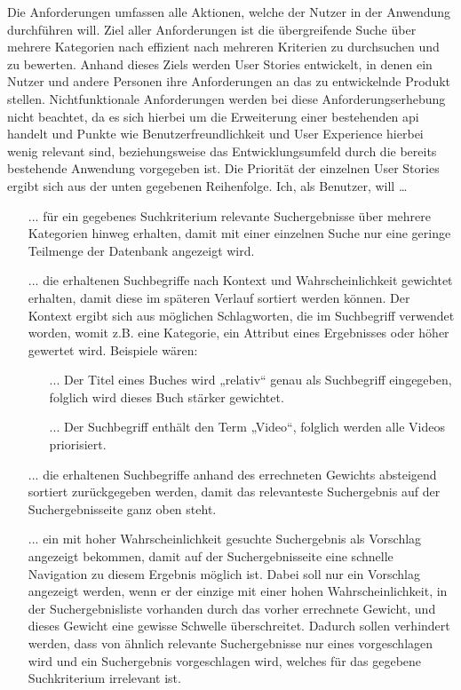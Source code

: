 Die Anforderungen umfassen alle Aktionen, welche der Nutzer in der Anwendung durchführen will. Ziel aller Anforderungen ist die übergreifende Suche über mehrere Kategorien nach effizient nach mehreren Kriterien zu durchsuchen und zu bewerten. Anhand dieses Ziels werden User Stories entwickelt, in denen ein Nutzer und andere Personen ihre Anforderungen an das zu entwickelnde Produkt stellen.
Nichtfunktionale Anforderungen werden bei diese Anforderungserhebung nicht beachtet, da es sich hierbei um die Erweiterung einer bestehenden \gls{api} handelt und Punkte wie Benutzerfreundlichkeit und User Experience hierbei wenig relevant sind, beziehungsweise das Entwicklungsumfeld durch die bereits bestehende Anwendung vorgegeben ist.
Die Priorität der einzelnen User Stories ergibt sich aus der unten gegebenen Reihenfolge.
Ich, als Benutzer, will …
\begin{itemize}
  \item[...] für ein gegebenes Suchkriterium relevante Suchergebnisse über mehrere Kategorien hinweg erhalten, damit mit einer einzelnen Suche nur eine geringe Teilmenge der Datenbank angezeigt wird.
  \item[...] die erhaltenen Suchbegriffe nach Kontext und Wahrscheinlichkeit gewichtet erhalten, damit diese im späteren Verlauf sortiert werden können. Der Kontext ergibt sich aus möglichen Schlagworten, die im Suchbegriff verwendet worden, womit z.B. eine Kategorie, ein Attribut eines Ergebnisses oder höher gewertet wird. Beispiele wären:
    \begin{itemize}
      \item[...] Der Titel eines Buches wird „relativ“ genau als Suchbegriff eingegeben, folglich wird dieses Buch stärker gewichtet.
      \item[...] Der Suchbegriff enthält den Term „Video“, folglich werden alle Videos priorisiert.
    \end{itemize}
  \item[...] die erhaltenen Suchbegriffe anhand des errechneten Gewichts absteigend sortiert zurückgegeben werden, damit das relevanteste Suchergebnis auf der Suchergebnisseite ganz oben steht.
  \item[...] ein mit hoher Wahrscheinlichkeit gesuchte Suchergebnis als Vorschlag angezeigt bekommen, damit auf der Suchergebnisseite eine schnelle Navigation zu diesem Ergebnis möglich ist.
    Dabei soll nur ein Vorschlag angezeigt werden, wenn er der einzige mit einer hohen Wahrscheinlichkeit, in der Suchergebnisliste vorhanden durch das vorher errechnete Gewicht, und dieses Gewicht eine gewisse Schwelle überschreitet.
    Dadurch sollen verhindert werden, dass von ähnlich relevante Suchergebnisse nur eines vorgeschlagen wird und ein Suchergebnis vorgeschlagen wird, welches für das gegebene Suchkriterium irrelevant ist.
\end{itemize}
